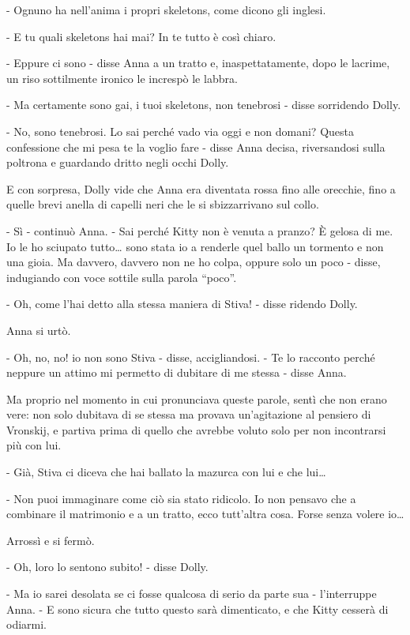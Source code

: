 - Ognuno ha nell'anima i propri skeletons, come dicono gli inglesi. 

- E tu quali skeletons hai mai? In te tutto è così chiaro. 

- Eppure ci sono - disse Anna a un tratto e, inaspettatamente, dopo le lacrime, un riso sottilmente ironico le increspò le labbra. 

- Ma certamente sono gai, i tuoi skeletons, non tenebrosi - disse sorridendo Dolly. 

- No, sono tenebrosi. Lo sai perché vado via oggi e non domani? Questa confessione che mi pesa te la voglio fare - disse Anna decisa, riversandosi sulla poltrona e guardando dritto negli occhi Dolly. 

E con sorpresa, Dolly vide che Anna era diventata rossa fino alle orecchie, fino a quelle brevi anella di capelli neri che le si sbizzarrivano sul collo. 

- Sì - continuò Anna. - Sai perché Kitty non è venuta a pranzo? È gelosa di me. Io le ho sciupato tutto\ldots{} sono stata io a renderle quel ballo un tormento e non una gioia. Ma davvero, davvero non ne ho colpa, oppure solo un poco - disse, indugiando con voce sottile sulla parola ``poco''. 

- Oh, come l'hai detto alla stessa maniera di Stiva! - disse ridendo Dolly. 

Anna si urtò. 

- Oh, no, no! io non sono Stiva - disse, accigliandosi. - Te lo racconto perché neppure un attimo mi permetto di dubitare di me stessa - disse Anna. 

Ma proprio nel momento in cui pronunciava queste parole, sentì che non erano vere: non solo dubitava di se stessa ma provava un'agitazione al pensiero di Vronskij, e partiva prima di quello che avrebbe voluto solo per non incontrarsi più con lui. 

- Già, Stiva ci diceva che hai ballato la mazurca con lui e che lui\ldots{} 

- Non puoi immaginare come ciò sia stato ridicolo. Io non pensavo che a combinare il matrimonio e a un tratto, ecco tutt'altra cosa. Forse senza volere io\ldots{} 

Arrossì e si fermò. 

- Oh, loro lo sentono subito! - disse Dolly. 

- Ma io sarei desolata se ci fosse qualcosa di serio da parte sua - l'interruppe Anna. - E sono sicura che tutto questo sarà dimenticato, e che Kitty cesserà di odiarmi. 

